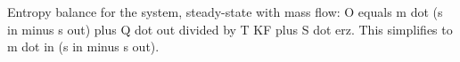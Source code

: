 Entropy balance for the system, steady-state with mass flow:  
O equals m dot (s in minus s out) plus Q dot out divided by T KF plus S dot erz.  
This simplifies to m dot in (s in minus s out).